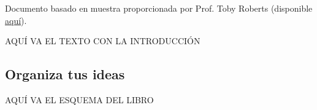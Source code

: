 Documento basado en muestra proporcionada por Prof. Toby Roberts (disponible \href{http://www.maths.adelaide.edu.au/anthony.roberts/LaTeX/Src/maths.tex}{aquí}).

AQUÍ VA EL TEXTO CON LA INTRODUCCIÓN
 
\subsection{Organiza tus ideas}
 AQUÍ VA EL ESQUEMA DEL LIBRO